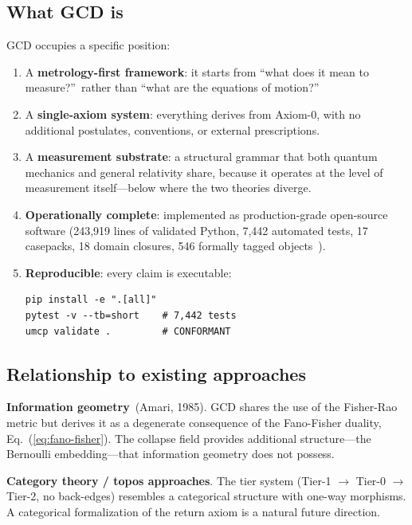 \documentclass[
  aps,
  prd,
  twocolumn,
  superscriptaddress,
  nofootinbib,
  floatfix
]{revtex4-2}
\begin{document}
\subsection{What GCD is}

GCD occupies a specific position:

\begin{enumerate}[leftmargin=*,label=(\roman*)]
\item A \textbf{metrology-first framework}: it starts from ``what
  does it mean to measure?''\ rather than ``what are the equations
  of motion?''

\item A \textbf{single-axiom system}: everything derives from
  Axiom-0, with no additional postulates, conventions, or external
  prescriptions.

\item A \textbf{measurement substrate}: a structural grammar that
  both quantum mechanics and general relativity share, because it
  operates at the level of measurement itself---below where the two
  theories diverge.

\item \textbf{Operationally complete}: implemented as
  production-grade open-source software (243{,}919 lines of
  validated Python, 7{,}442 automated tests, 17 casepacks,
  18 domain closures, 546 formally tagged
  objects~\cite{umcpmetadatarepo}).

\item \textbf{Reproducible}: every claim is executable:
  \begingroup\small
  \begin{verbatim}
pip install -e ".[all]"
pytest -v --tb=short    # 7,442 tests
umcp validate .         # CONFORMANT
  \end{verbatim}
  \endgroup
\end{enumerate}

\subsection{Relationship to existing approaches}

\textbf{Information geometry}~(Amari, 1985).  GCD shares the use of
the Fisher-Rao metric but derives it as a degenerate consequence of
the Fano-Fisher duality, Eq.~(\ref{eq:fano-fisher}).  The collapse
field provides additional structure---the Bernoulli embedding---that
information geometry does not possess.

\textbf{Category theory / topos approaches}.  The tier system
(Tier-1 $\to$ Tier-0 $\to$ Tier-2, no back-edges) resembles a
categorical structure with one-way morphisms.  A categorical
formalization of the return axiom is a natural future direction.
\end{document}
